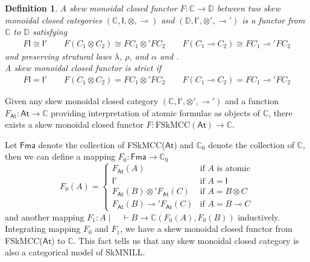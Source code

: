 \documentclass[submission,copyright,creativecommons]{eptcs}
\newtheorem{defn}[theorem]{Definition}
\newcommand{\ot}{\otimes}
\newcommand{\lolli}{\multimap}
\newcommand{\I}{\mathsf{I}}
\begin{document}
\begin{defn}
  A skew monoidal closed functor $F : \mathbb{C} \rightarrow \mathbb{D}$ between two skew monoidal closed categories $(\mathbb{C} , \I , \ot , \lolli)$ and $(\mathbb{D} , \I' , \ot' , \lolli')$ is a functor from $\mathbb{C}$ to $\mathbb{D}$ satisfying
  \begin{align*}
    F \I \cong \I' \qquad F (C_{1} \ot C_{2}) \cong F C_{1} \ot' F C_{2} \qquad
    F(C_{1} \lolli C_{2}) \cong F C_{1} \lolli' F C_{2}
  \end{align*}
  and preserving strutural laws $\lambda$, $\rho$, and $\alpha$ and .
  \\
  A skew monoidal closed functor is strict if
  \begin{align*}
    F \I = \I' \qquad F (C_{1} \ot C_{2}) = F C_{1} \ot' F C_{2} \qquad
    F(C_{1} \lolli C_{2}) = F C_{1} \lolli' F C_{2}
  \end{align*}
\end{defn}
  Given any skew monoidal closed category $(\mathbb{C} , \I' , \ot' , \lolli')$ and a function $F_{\mathsf{At}} : \mathsf{At} \rightarrow \mathbb{C}$ providing interpretation of atomic formulae as objects of $\mathbb{C}$, there exists a skew monoidal closed functor $F : \text{FSkMCC}(\mathsf{At}) \rightarrow \mathbb{C}$.

  Let $\mathsf{Fma}$ denote the collection of FSkMCC($\mathsf{At}$) and $\mathbb{C}_{0}$ denote the collection of $\mathbb{C}$, then we can define a mapping $F_{0} : \mathsf{Fma} \rightarrow \mathbb{C}_{0}$
  \begin{equation*}
    F_{0} (A)=
    \begin{cases}
      F_{\mathsf{At}} (A) &\text{if } A \text{ is atomic}
      \\
      \I' &\text{if } A = \I
      \\
      F_{\mathsf{At}} (B) \ot' F_{\mathsf{At}} (C) &\text{if } A = B \ot C
      \\
      F_{\mathsf{At}} (B) \lolli' F_{\mathsf{At}} (C) &\text{if } A = B \lolli C
    \end{cases}
  \end{equation*}
  and another mapping $F_{1} : A \mid \quad \vdash B \to \mathbb{C} (F_{0} (A), F_{0} (B))$ inductively.
  Integrating mapping $F_{0}$ and $F_{1}$, we have a skew monoidal closed functor from FSkMCC($\mathsf{At}$) to $\mathbb{C}$.
  This fact tells us that any skew monoidal closed category is also a categorical model of SkMNILL.
\end{document}
